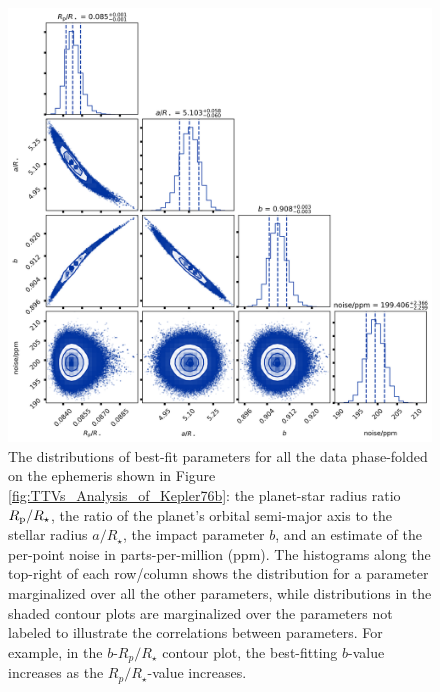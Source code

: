 \documentclass[manuscript]{aastex62}
\begin{document}
\begin{figure}
    \includegraphics[width=\textwidth]{folded-transit-corner-plot_Analysis-of-Kepler76b.png}
    \caption{The distributions of best-fit parameters for all the data phase-folded on the ephemeris shown in Figure \ref{fig:TTVs_Analysis_of_Kepler76b}: the planet-star radius ratio $R_{\rm p}/R_\star$, the ratio of the planet's orbital semi-major axis to the stellar radius $a/R_\star$, the impact parameter $b$, and an estimate of the per-point noise in parts-per-million (ppm). The histograms along the top-right of each row/column shows the distribution for a parameter marginalized over all the other parameters, while distributions in the shaded contour plots are marginalized over the parameters not labeled to illustrate the correlations between parameters. For example, in the $b$-$R_p/R_\star$ contour plot, the best-fitting $b$-value increases as the $R_p/R_\star$-value increases.}
    \label{fig:folded-transit-corner-plot_Analysis-of-Kepler76b}
\end{figure}
\end{document}
